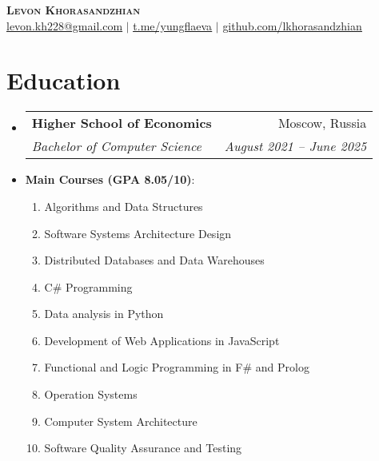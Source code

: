 \documentclass[letterpaper,11pt]{article}
\makeatletter
\newcommand{\resumeItem}[1]{
  \item\small{
    {#1 \vspace{-2pt}}
  }
}
\newcommand{\resumeSubheading}[4]{
  \vspace{-2pt}\item
    \begin{tabular*}{0.97\textwidth}[t]{l@{\extracolsep{\fill}}r}
      \textbf{#1} & #2 \\
      \textit{\small#3} & \textit{\small #4} \\
    \end{tabular*}\vspace{-7pt}
}
\newcommand{\resumeSubHeadingListStart}{\begin{itemize}[leftmargin=0.15in, label={}]}
\newcommand{\resumeSubHeadingListEnd}{\end{itemize}}
\makeatother
\begin{document}

\begin{center}
    \textbf{\Huge \scshape Levon Khorasandzhian} \\ \vspace{1pt}
    \href{mailto:levon.kh228@gmail.com}{\underline{levon.kh228@gmail.com}} $|$ 
    \href{https://t.me/yungflaeva}{\underline{t.me/yungflaeva}} $|$
    \href{https://github.com/lkhorasandzhian}{\underline{github.com/lkhorasandzhian}}
\end{center}


\section{Education}
  \resumeSubHeadingListStart
    \resumeSubheading
      {Higher School of Economics}{Moscow, Russia}
      {Bachelor of Computer Science}{August 2021 -- June 2025}
      \resumeItem
    {\textbf{Main Courses (GPA 8.05/10)}:
    \begin{enumerate}
        \item Algorithms and Data Structures
        \item Software Systems Architecture Design
        \item Distributed Databases and Data Warehouses
        \item C\# Programming
        \item Data analysis in Python
        \item Development of Web Applications in JavaScript
        \item Functional and Logic Programming in F\# and Prolog
        \item Operation Systems
        \item Computer System Architecture
        \item Software Quality Assurance and Testing
    \end{enumerate}
    }
  \resumeSubHeadingListEnd

\end{document}
